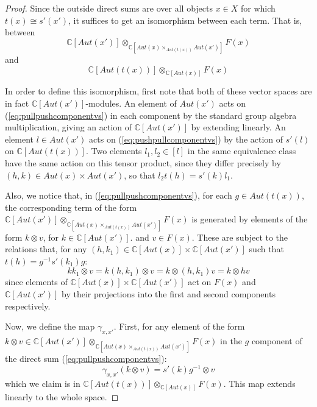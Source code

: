 \documentclass[10pt]{amsart}
\numberwithin{theorem}{subsection}
\newcommand{\ra}{\mathop{\rightarrow}}
\begin{document}
\begin{proof}
Since the outside direct sums are over all objects $x \in X$ for
which $t(x) \cong s'(x')$, it suffices to get an isomorphism between
each term.  That is, between 
\begin{equation}\label{eq:pullpushcomponentvs}
\mathbb{C}[Aut({x'})] \otimes_{\mathbb{C}[Aut(x) \times_{Aut(t(x))} Aut({x'})]} F(x)
\end{equation}
and
\begin{equation}\label{eq:pushpullcomponentvs}
\mathbb{C}[Aut(t(x))] \otimes_{\mathbb{C}[Aut(x)]} F(x) 
\end{equation}

In order to define this isomorphism, first note that both of these
vector spaces are in fact $\mathbb{C}[Aut({x'})]$-modules.  An element
of $Aut({x'})$ acts on (\ref{eq:pullpushcomponentvs}) in each component
by the standard group algebra multiplication, giving an action of
$\mathbb{C}[Aut({x'})]$ by extending linearly.  An element $l \in
Aut({x'})$ acts on (\ref{eq:pushpullcomponentvs}) by the action of
$s'(l)$ on $\mathbb{C}[Aut(t(x))]$.  Two elements $l_1, l_2 \in [l]$ in the
same equivalence class have the same action on this tensor product,
since they differ precisely by $(h,k) \in Aut(x) \times Aut({x'})$, so that
$l_2 t(h) = s'(k) l_1$.

Also, we notice that, in (\ref{eq:pullpushcomponentvs}), for each $g
\in Aut(t(x))$, the corresponding term of the form $\mathbb{C}[Aut({x'})]
\otimes_{\mathbb{C}[Aut(x) \times_{Aut(t(x))} Aut({x'})]} F(x)$ is generated by
elements of the form $k \otimes v$, for $k \in \mathbb{C}[Aut({x'})]$.  
and $v \in F(x)$.  These are subject to the relations that, for any
$(h,k_1) \in \mathbb{C}[Aut({x})] \times \mathbb{C}[Aut({x'})]$ such that
$t(h) = g^{-1} s'(k_1) g$:
\begin{equation}
kk_1 \otimes v = k (h,k_1) \otimes v = k \otimes (h,k_1) v = k \otimes hv
\end{equation}
since elements of $\mathbb{C}[Aut({x})] \times \mathbb{C}[Aut({x'})]$ act
on $F(x)$ and $\mathbb{C}[Aut({x'})]$  by their projections into
the first and second components respectively.

Now, we define the map $\gamma_{x,x'}$.  First, for any element of the
form $k \otimes v \in \mathbb{C}[Aut({x'})] \otimes_{\mathbb{C}[Aut(x)
\times_{Aut(t(x))} Aut({x'})]} F(x)$ in the $g$ component of the direct sum
(\ref{eq:pullpushcomponentvs}):
\begin{equation}
\gamma_{x,x'} (k\otimes v) = s'(k) g^{-1} \otimes v
\end{equation}
which we claim is in $\mathbb{C}[Aut(t(x))] \otimes_{\mathbb{C}[Aut({x})]}
F(x)$.  This map extends linearly to the whole space.


\end{proof}
\end{document}
